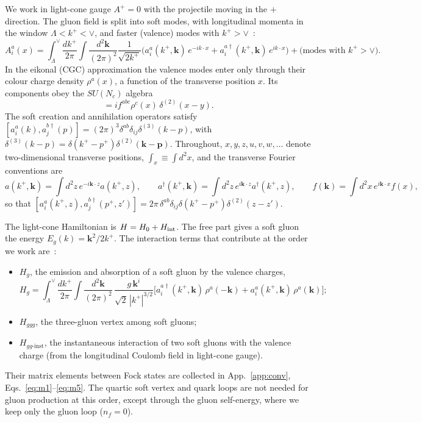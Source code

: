 \documentclass[aps,prd,onecolumn,superscriptaddress,nofootinbib,floatfix,longbibliography,11pt]{revtex4-2}
\numberwithin{equation}{section}
\begin{document}
We work in light-cone gauge $A^+=0$ with the projectile moving in the $+$ direction. The gluon field is split into soft modes, with longitudinal momenta in the window $\Lambda<k^+<\vee$, and faster (valence) modes with $k^+>\vee$~\cite{Kovner:2005nq,Lublinsky:2016meo}:
\begin{equation}
A_i^a(x)=\int_{\Lambda}^{\vee}\frac{dk^+}{2\pi}\int\frac{d^2\mathbf k}{(2\pi)^2}\frac{1}{\sqrt{2k^+}}\Big(a_i^a(k^+,\mathbf k)\,e^{-ik\cdot x}+a_i^{a\dagger}(k^+,\mathbf k)\,e^{ik\cdot x}\Big)+\big(\text{modes with }k^+>\vee\big).
\label{eq:Asoft}
\end{equation}
In the eikonal (CGC) approximation the valence modes enter only through their colour charge density $\rho^a(x)$, a function of the transverse position $x$. Its components obey the $SU(N_c)$ algebra
\begin{equation}
[\rho^a(x),\rho^b(y)]=if^{abc}\rho^c(x)\,\delta^{(2)}(x-y).
\label{eq:rhoalg}
\end{equation}
The soft creation and annihilation operators satisfy $[a^a_i(k),a^{b\dagger}_j(p)]=(2\pi)^3\delta^{ab}\delta_{ij}\delta^{(3)}(k-p)$, with $\delta^{(3)}(k-p)=\delta(k^+-p^+)\delta^{(2)}(\mathbf k-\mathbf p)$. Throughout, $x,y,z,u,v,w,\ldots$ denote two-dimensional transverse positions, $\int_x\equiv\int d^2x$, and the transverse Fourier conventions are
\begin{equation}
a(k^+,\mathbf k)=\int d^2z\,e^{-i\mathbf k\cdot z}a(k^+,z),\qquad a^\dagger(k^+,\mathbf k)=\int d^2z\,e^{i\mathbf k\cdot z}a^\dagger(k^+,z),\qquad f(\mathbf k)=\int d^2x\,e^{i\mathbf k\cdot x}f(x),
\label{eq:FTconv}
\end{equation}
so that $[a^a_i(k^+,z),a^{b\dagger}_j(p^+,z')]=2\pi\,\delta^{ab}\delta_{ij}\delta(k^+-p^+)\delta^{(2)}(z-z')$.

The light-cone Hamiltonian is $H=H_0+H_{\rm int}$. The free part gives a soft gluon the energy $E_g(k)=\mathbf k^2/2k^+$. The interaction terms that contribute at the order we work are~\cite{Lublinsky:2016meo}:
\begin{itemize}
\item $H_g$, the emission and absorption of a soft gluon by the valence charges,
\begin{equation}
H_g=\int_{\Lambda}^{\vee}\frac{dk^+}{2\pi}\int\frac{d^2\mathbf k}{(2\pi)^2}\,\frac{g\,\mathbf k^i}{\sqrt2\,|k^+|^{3/2}}\Big[a_i^{a\dagger}(k^+,\mathbf k)\,\rho^a(-\mathbf k)+a_i^a(k^+,\mathbf k)\,\rho^a(\mathbf k)\Big];
\label{eq:Hg}
\end{equation}
\item $H_{ggg}$, the three-gluon vertex among soft gluons;
\item $H_{gg\text{-inst}}$, the instantaneous interaction of two soft gluons with the valence charge (from the longitudinal Coulomb field in light-cone gauge).
\end{itemize}
Their matrix elements between Fock states are collected in App.~\ref{app:conv}, Eqs.~\eqref{eq:m1}--\eqref{eq:m5}. The quartic soft vertex and quark loops are not needed for gluon production at this order, except through the gluon self-energy, where we keep only the gluon loop ($n_f=0$).
\end{document}
